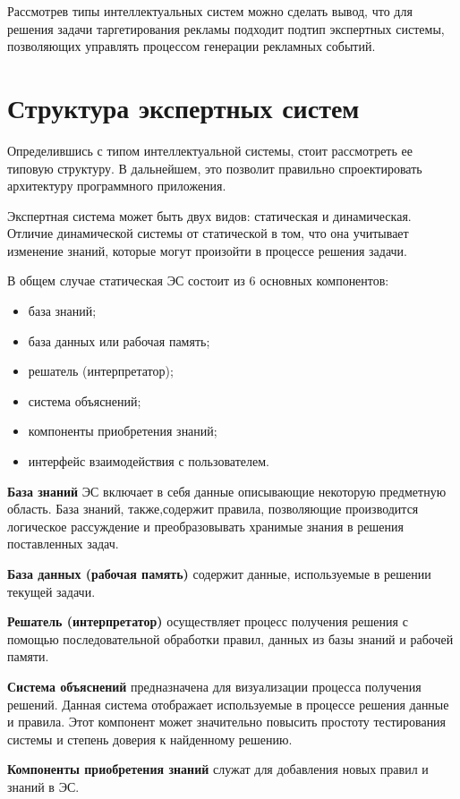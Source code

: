 Рассмотрев типы интеллектуальных систем можно сделать вывод, что для решения задачи таргетирования рекламы подходит подтип экспертных системы, позволяющих управлять процессом генерации рекламных событий.

\section{Структура экспертных систем}

Определившись с типом интеллектуальной системы, стоит рассмотреть ее типовую структуру. В дальнейшем, это позволит правильно спроектировать архитектуру программного приложения.

Экспертная система может быть двух видов: статическая и динамическая. Отличие динамической системы от статической в том, что она учитывает изменение знаний, которые могут произойти в процессе решения задачи.

В общем случае статическая ЭС состоит из 6 основных компонентов:
\begin{itemize}
\item база знаний;
\item база данных или рабочая память;
\item решатель (интерпретатор);
\item система объяснений; 
\item компоненты приобретения знаний;
\item интерфейс взаимодействия с пользователем. 
\end{itemize}

\textbf{База знаний} ЭС включает в себя данные описывающие некоторую предметную область. База знаний, также,содержит правила, позволяющие производится логическое рассуждение и преобразовывать хранимые знания в решения поставленных задач.

\textbf{База данных (рабочая память)} содержит данные, используемые в решении текущей задачи.

\textbf{Решатель (интерпретатор)} осуществляет процесс получения решения с помощью последовательной обработки правил, данных из базы знаний и рабочей памяти.

\textbf{Система объяснений} предназначена для визуализации процесса получения решений. Данная система отображает используемые в процессе решения данные и правила. Этот компонент может значительно повысить простоту тестирования системы и степень доверия к найденному решению.

\textbf{Компоненты приобретения знаний} служат для добавления новых правил и знаний в ЭС. 
    
